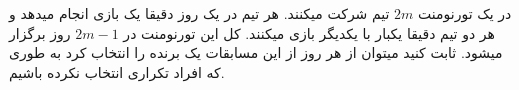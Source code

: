 در یک تورنومنت $2m$ تیم شرکت میکنند.
هر تیم در یک روز دقیقا یک بازی انجام میدهد و هر دو تیم دقیقا یکبار با یکدیگر بازی میکنند.
کل این تورنومنت در $2m - 1$ روز برگزار میشود.
ثابت کنید میتوان از هر روز از این مسابقات یک برنده را انتخاب کرد به طوری که افراد تکراری انتخاب نکرده باشیم.